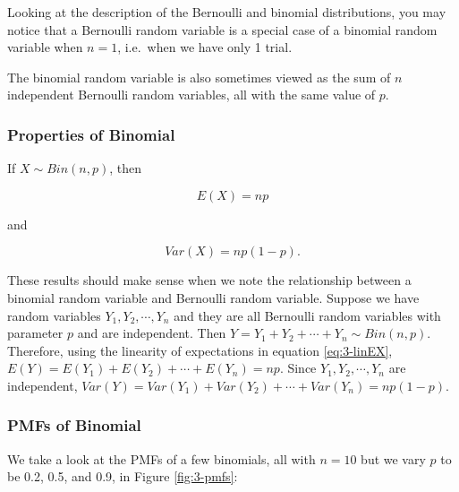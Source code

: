 \documentclass[
]{book}
\begin{document}
Looking at the description of the Bernoulli and binomial distributions, you may notice that a Bernoulli random variable is a special case of a binomial random variable when \(n=1\), i.e.~when we have only 1 trial.

The binomial random variable is also sometimes viewed as the sum of \(n\) independent Bernoulli random variables, all with the same value of \(p\).

\hypertarget{properties-of-binomial}{%
\subsubsection{Properties of Binomial}\label{properties-of-binomial}}

If \(X \sim Bin(n,p)\), then

\begin{equation} 
E(X) = np
\label{eq:3-bin-EX}
\end{equation}

and

\begin{equation} 
Var(X) = np(1-p).
\label{eq:3-bin-var}
\end{equation}

These results should make sense when we note the relationship between a binomial random variable and Bernoulli random variable. Suppose we have random variables \(Y_1, Y_2, \cdots, Y_n\) and they are all Bernoulli random variables with parameter \(p\) and are independent. Then \(Y = Y_1 + Y_2 + \cdots + Y_n \sim Bin(n,p)\). Therefore, using the linearity of expectations in equation \eqref{eq:3-linEX}, \(E(Y) = E(Y_1) + E(Y_2) + \cdots + E(Y_n) = np\). Since \(Y_1, Y_2, \cdots, Y_n\) are independent, \(Var(Y) = Var(Y_1) + Var(Y_2) + \cdots + Var(Y_n) = np(1-p)\).

\hypertarget{pmfs-of-binomial}{%
\subsubsection{PMFs of Binomial}\label{pmfs-of-binomial}}

We take a look at the PMFs of a few binomials, all with \(n=10\) but we vary \(p\) to be 0.2, 0.5, and 0.9, in Figure \ref{fig:3-pmfs}:
\end{document}
